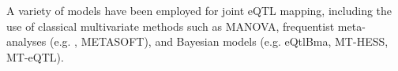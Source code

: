 %
%
A variety of models have been employed for joint \gls{eQTL} mapping, including
the use of classical multivariate methods such as \gls{MANOVA}\autocite{kim2014CharacterizingGeneticBasis},
frequentist meta-analyses (e.g. \autocite{sul2013EffectivelyIdentifyingEQTLs}, METASOFT), 
and Bayesian models (e.g. eQtlBma\autocite{flutre2013StatisticalFrameworkJoint}, MT-HESS, MT-eQTL).

